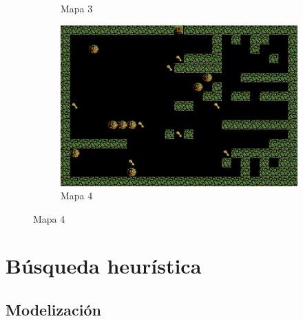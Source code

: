 \documentclass[11pt,spanish]{article}
\begin{document}
\begin{figure}[h!]
\begin{subfigure}[b]{0.40\linewidth}
					\caption{Mapa 3}
				\end{subfigure}
				\begin{subfigure}[b]{0.59\linewidth}
					\includegraphics[width=\linewidth]{sat/lab4.png}
					\caption{Mapa 4}
				\end{subfigure}
			\end{figure}
	\newpage
	\section{Búsqueda heurística}
		\subsection{Modelización}
\end{document}

